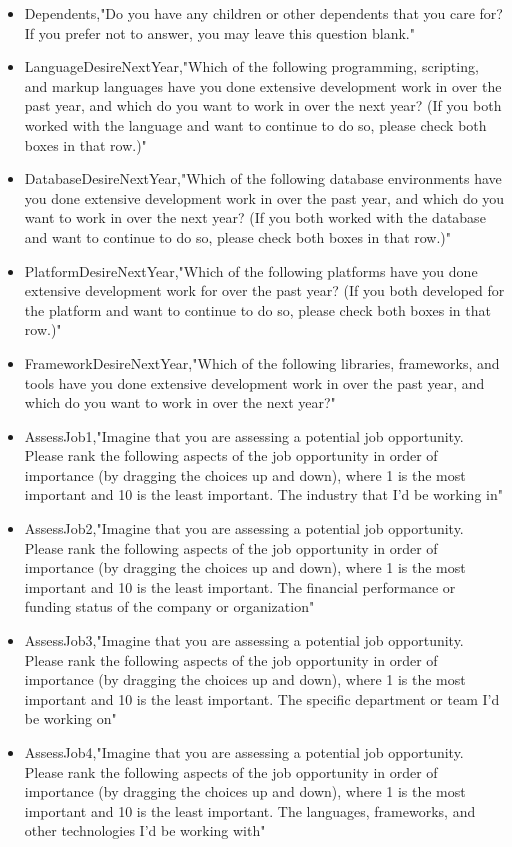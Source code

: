 \begin{appendices}
\begin{itemize}
        \item Dependents,"Do you have any children or other dependents that you care for? If you prefer not to answer, you may leave this question blank."
        \item LanguageDesireNextYear,"Which of the following programming, scripting, and markup languages have you done extensive development work in over the past year, and which do you want to work in over the next year?  (If you both worked with the language and want to continue to do so, please check both boxes in that row.)"
        \item DatabaseDesireNextYear,"Which of the following database environments have you done extensive development work in over the past year, and which do you want to work in over the next year?   (If you both worked with the database and want to continue to do so, please check both boxes in that row.)"
        \item PlatformDesireNextYear,"Which of the following platforms have you done extensive development work for over the past year?   (If you both developed for the platform and want to continue to do so, please check both boxes in that row.)"
        \item FrameworkDesireNextYear,"Which of the following libraries, frameworks, and tools have you done extensive development work in over the past year, and which do you want to work in over the next year?"
        \item AssessJob1,"Imagine that you are assessing a potential job opportunity. Please rank the following aspects of the job opportunity in order of importance (by dragging the choices up and down), where 1 is the most important and 10 is the least important. The industry that I'd be working in"
        \item AssessJob2,"Imagine that you are assessing a potential job opportunity. Please rank the following aspects of the job opportunity in order of importance (by dragging the choices up and down), where 1 is the most important and 10 is the least important. The financial performance or funding status of the company or organization"
        \item AssessJob3,"Imagine that you are assessing a potential job opportunity. Please rank the following aspects of the job opportunity in order of importance (by dragging the choices up and down), where 1 is the most important and 10 is the least important. The specific department or team I'd be working on"
        \item AssessJob4,"Imagine that you are assessing a potential job opportunity. Please rank the following aspects of the job opportunity in order of importance (by dragging the choices up and down), where 1 is the most important and 10 is the least important. The languages, frameworks, and other technologies I'd be working with"

\end{itemize}
\end{appendices}
